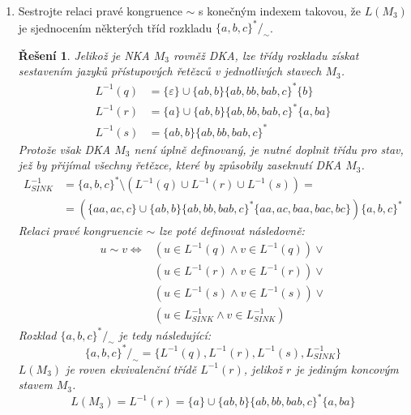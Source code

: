 \documentclass[11pt, a4paper]{article}
\theoremstyle{result}
\newtheorem*{result}{Řešení}
\begin{document}
\begin{enumerate}
\begin{enumerate}
        \item Sestrojte relaci pravé kongruence $\sim$ s konečným indexem takovou, že $L(M_3)$ je sjednocením některých tříd rozkladu $\{a, b, c\}^*/_\sim$.
        
        \begin{result}
            Jelikož je NKA $M_3$ rovněž DKA, lze třídy rozkladu získat sestavením jazyků přístupo\-vých řetězců v jednotlivých stavech $M_3$.
            \begin{align*}
                L^{-1}(q) &= \{\varepsilon\} \cup \{ab, b\}\{ab, bb, bab, c\}^*\{b\} \\
                L^{-1}(r) &= \{a\} \cup \{ab, b\}\{ab, bb, bab, c\}^*\{a, ba\} \\
                L^{-1}(s) &= \{ab, b\}\{ab, bb, bab, c\}^*
            \end{align*}
            Protože však DKA $M_3$ není úplně definovaný, je nutné doplnit třídu pro stav, jež by přijímal všechny řetězce, které by způsobily zaseknutí DKA $M_3$.
            \begin{align*}
                L^{-1}_\mathit{SINK} &= \{a, b, c\}^* \setminus (L^{-1}(q) \cup L^{-1}(r) \cup L^{-1}(s)) = \\
                                     &= (\{aa, ac, c\} \cup \{ab, b\}\{ab, bb, bab, c\}^*\{aa, ac, baa, bac, bc\})\{a, b, c\}^*
            \end{align*}
            Relaci pravé kongruencie $\sim$ lze poté definovat následovně:
            \begin{align*}
                u \sim v \iff &(u \in L^{-1}(q) \land v \in L^{-1}(q)) \lor \\
                              &(u \in L^{-1}(r) \land v \in L^{-1}(r)) \lor \\
                              &(u \in L^{-1}(s) \land v \in L^{-1}(s)) \lor \\
                              &(u \in L^{-1}_\mathit{SINK} \land v \in L^{-1}_\mathit{SINK})
            \end{align*}
            Rozklad $\{a, b, c\}^*/_\sim$ je tedy následující:
            $$\{a, b, c\}^* /_\sim = \{ L^{-1}(q), L^{-1}(r), L^{-1}(s), L^{-1}_\mathit{SINK}\}$$
            $L(M_3)$ je roven ekvivalenční třídě $L^{-1}(r)$, jelikož $r$ je jediným koncovým stavem $M_3$.
            $$L(M_3) = L^{-1}(r) = \{a\} \cup \{ab, b\}\{ab, bb, bab, c\}^*\{a, ba\}$$
        \end{result}
    \end{enumerate}
    

\end{enumerate}
\end{document}

